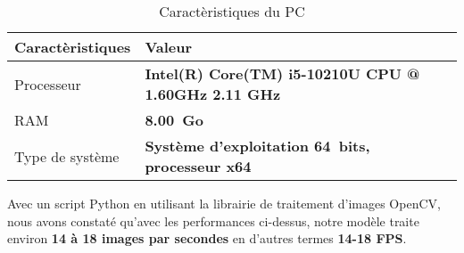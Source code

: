     \begin{table}[H]
        \centering
        \begin{tabular}{|l|l|}
            \hline
            \rowcolor{Gray}
            \textbf{Caractèristiques} & \textbf{Valeur} \\ \hline
            Processeur & \textbf{Intel(R) Core(TM) i5-10210U CPU @ 1.60GHz   2.11 GHz} \\ \hline
            RAM & \textbf{8.00 Go} \\ \hline
            Type de système & \textbf{Système d’exploitation 64 bits, processeur x64} \\ \hline
        \end{tabular}
        \caption{Caractèristiques du PC}
    \end{table}
    Avec un script Python en utilisant la librairie de traitement d’images OpenCV, nous avons constaté qu’avec les performances ci-dessus, notre modèle traite environ \textbf{14 à 18 images par secondes} en d’autres termes \textbf{14-18 FPS}.
    